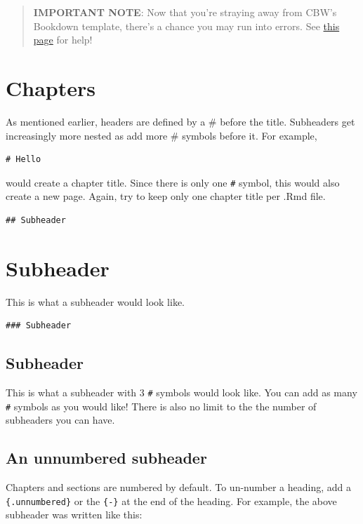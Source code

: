 \documentclass[
]{book}
\theoremstyle{definition}
\theoremstyle{definition}
\theoremstyle{definition}
\theoremstyle{definition}
\theoremstyle{remark}
\begin{document}
\begin{quote}
\textbf{IMPORTANT NOTE}: Now that you're straying away from CBW's Bookdown template, there's a chance you may run into errors. See \hyperref[help]{this page} for help!
\end{quote}

\section{Chapters}\label{chapters}

As mentioned earlier, headers are defined by a \# before the title. Subheaders get increasingly more nested as add more \# symbols before it. For example,

\begin{verbatim}
# Hello
\end{verbatim}

would create a chapter title. Since there is only one \texttt{\#} symbol, this would also create a new page. Again, try to keep only one chapter title per .Rmd file.

\begin{verbatim}
## Subheader
\end{verbatim}

\section{Subheader}\label{subheader}

This is what a subheader would look like.

\begin{verbatim}
### Subheader
\end{verbatim}

\subsection{Subheader}\label{subheader-1}

This is what a subheader with 3 \texttt{\#} symbols would look like. You can add as many \texttt{\#} symbols as you would like! There is also no limit to the the number of subheaders you can have.

\subsection*{An unnumbered subheader}\label{an-unnumbered-subheader}

Chapters and sections are numbered by default. To un-number a heading, add a \texttt{\{.unnumbered\}} or the \texttt{\{-\}} at the end of the heading. For example, the above subheader was written like this:
\end{document}
